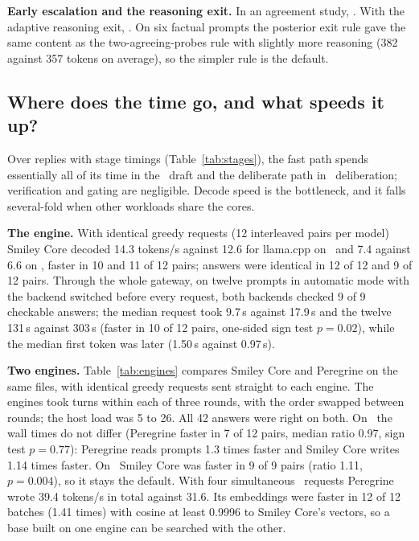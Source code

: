 \textbf{Early escalation and the reasoning exit.} In an agreement study,
\EarlyEscSummary. With the adaptive reasoning exit, \AdaptiveExitSummary. On
six factual prompts the posterior exit rule gave the same content as the
two-agreeing-probes rule with slightly more reasoning (382 against 357 tokens
on average), so the simpler rule is the default.

\subsection{Where does the time go, and what speeds it up?}
\label{sec:eval:inference}
Over \StageReplies{} replies with stage timings (Table~\ref{tab:stages}), the
fast path spends essentially all of its time in the \Sone\ draft and the
deliberate path in \Stwo\ deliberation; verification and gating are
negligible. Decode speed is the bottleneck, and it falls several-fold when
other workloads share the cores.

\begin{table}[t]
\centering\caption{Latency by stage (share of wall time; llama.cpp backend)}\label{tab:stages}
\resizebox{\columnwidth}{!}{\StageTable}
\end{table}

\textbf{The engine.} With identical greedy requests (12 interleaved pairs per
model) Smiley Core decoded 14.3 tokens/s against 12.6 for llama.cpp on \Sone\
and 7.4 against 6.6 on \Stwo, faster in 10 and 11 of 12 pairs; answers were
identical in 12 of 12 and 9 of 12 pairs. Through the whole gateway, on twelve
prompts in automatic mode with the backend switched before every request,
both backends checked 9 of 9 checkable answers; the median request took 9.7\,s
against 17.9\,s and the twelve 131\,s against 303\,s (faster in 10 of 12
pairs, one-sided sign test $p=0.02$), while the median first token was later
(1.50\,s against 0.97\,s).

\textbf{Two engines.} Table~\ref{tab:engines} compares Smiley Core and
Peregrine on the same files, with identical greedy requests sent straight to
each engine. The engines took turns within each of three rounds, with the
order swapped between rounds; the host load was 5 to 26. All 42 answers were
right on both. On \Sone\ the wall times do not differ (Peregrine faster in 7 of
12 pairs, median ratio 0.97, sign test $p=0.77$): Peregrine reads prompts 1.3
times faster and Smiley Core writes 1.14 times faster. On \Stwo\ Smiley Core
was faster in 9 of 9 pairs (ratio 1.11, $p=0.004$), so it stays the default.
With four simultaneous \Sone\ requests Peregrine wrote 39.4 tokens/s in
total against 31.6. Its embeddings were faster in 12 of 12 batches (1.41
times) with cosine at least 0.9996 to Smiley Core's vectors, so a base built
on one engine can be searched with the other.

